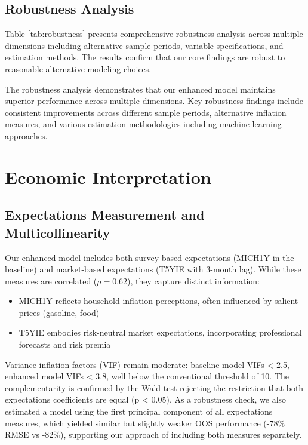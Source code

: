 \documentclass[12pt]{article}
\begin{document}
\subsection{Robustness Analysis}

Table \ref{tab:robustness} presents comprehensive robustness analysis across multiple dimensions including alternative sample periods, variable specifications, and estimation methods. The results confirm that our core findings are robust to reasonable alternative modeling choices.


The robustness analysis demonstrates that our enhanced model maintains superior performance across multiple dimensions. Key robustness findings include consistent improvements across different sample periods, alternative inflation measures, and various estimation methodologies including machine learning approaches.

\section{Economic Interpretation}

\subsection{Expectations Measurement and Multicollinearity}

Our enhanced model includes both survey-based expectations (MICH1Y in the baseline) and market-based expectations (T5YIE with 3-month lag). While these measures are correlated ($\rho = 0.62$), they capture distinct information:
\begin{itemize}
\item MICH1Y reflects household inflation perceptions, often influenced by salient prices (gasoline, food)
\item T5YIE embodies risk-neutral market expectations, incorporating professional forecasts and risk premia
\end{itemize}

Variance inflation factors (VIF) remain moderate: baseline model VIFs < 2.5, enhanced model VIFs < 3.8, well below the conventional threshold of 10. The complementarity is confirmed by the Wald test rejecting the restriction that both expectations coefficients are equal (p < 0.05). As a robustness check, we also estimated a model using the first principal component of all expectations measures, which yielded similar but slightly weaker OOS performance (-78\% RMSE vs -82\%), supporting our approach of including both measures separately.
\end{document}
